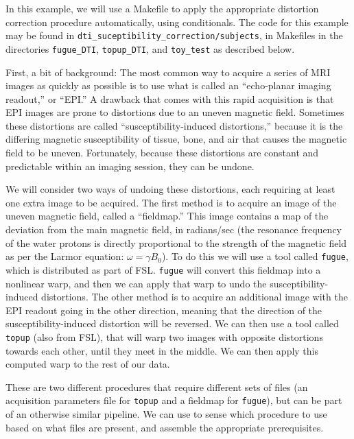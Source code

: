 \label{chap:dti}

In this example, we will use a Makefile to apply the appropriate
distortion correction procedure automatically, using conditionals. The
code for this example may be found in
\texttt{dti_suceptibility_correction/subjects}, in Makefiles in the
directories \texttt{fugue_DTI}, \texttt{topup_DTI}, and
\texttt{toy_test} as described below.

First, a bit of background: The most common way to acquire a series of
MRI images as quickly as possible is to use what is called an
``echo-planar imaging readout,'' or ``EPI.'' A drawback that comes
with this rapid acquisition is that EPI images are prone to
distortions due to an uneven magnetic field. Sometimes these
distortions are called ``susceptibility-induced distortions,'' because
it is the differing magnetic susceptibility of tissue, bone, and air
that causes the magnetic field to be uneven. Fortunately, because these
distortions are constant and predictable within an imaging session,
they can be undone.

We will consider two ways of undoing these distortions, each requiring
at least one extra image to be acquired. The first method is to
acquire an image of the uneven magnetic field, called a ``fieldmap.''
This image contains a map of the deviation from the main magnetic
field, in radians/sec (the resonance frequency of the water protons is
directly proportional to the strength of the magnetic field as per the
Larmor equation: $\omega=\gamma B _{0}$). To do this we will use a
tool called \texttt{fugue}, which is distributed as part of
FSL. \texttt{fugue} will convert this fieldmap into a nonlinear warp,
and then we can apply that warp to undo the susceptibility-induced
distortions. The other method is to acquire an additional image with
the EPI readout going in the other direction, meaning that the
direction of the susceptibility-induced distortion will be
reversed. We can then use a tool called \texttt{topup} (also from
FSL), that will warp two images with opposite distortions towards each
other, until they meet in the middle. We can then apply this computed
warp to the rest of our data.


These are two different procedures that require different sets of
files (an acquisition parameters file for \texttt{topup} and a
fieldmap for \texttt{fugue}), but can be part of an otherwise similar
pipeline. We can use \maken{} to sense which procedure to use based on
what files are present, and assemble the appropriate prerequisites.


